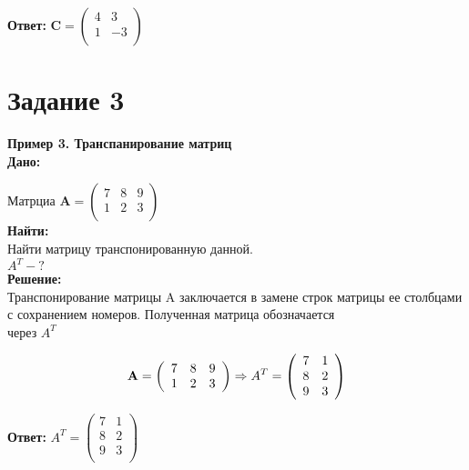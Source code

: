 \documentclass[a4paper,12pt]{article} %
\begin{document}
\textbf{Ответ:} 
$\mathbf{C} =  \left( \begin{array}{cc}
4 & 3 \\
1 & -3\\
\end{array} \right)
$
   
\newpage

\section{Задание 3}
\textbf{Пример 3. Транспанирование матриц} \\
\small{\textbf{Дано:}}

Матрциа $\mathbf{A} =
\left( \begin{array}{ccc}
7 & 8 & 9 \\
1 & 2 & 3 \\
\end{array} \right)$\\

\small{\textbf{Найти:}}\\
Найти матрицу транспонированную данной.\\
$A^{T} -?$ \\
\small{\textbf{Решение:}}\\
Транспонирование матрицы A заключается в замене строк матрицы ее
столбцами с сохранением номеров. Полученная матрица обозначается\\
через $A^{T}$

\begin{displaymath}
\\
\mathbf{A} =
\left( \begin{array}{ccc}
7 & 8 & 9 \\
1 & 2 & 3 \\
\end{array} \right) \Rightarrow A^{T} = \left( \begin{array}{cc}
7 & 1  \\
8 & 2 \\
9 & 3\\
\end{array} \right)
\end{displaymath}

\small{\textbf{Ответ:}}  $A^{T} = \left( \begin{array}{cc}
7 & 1  \\
8 & 2 \\
9 & 3\\
\end{array} \right)$
\end{document}

